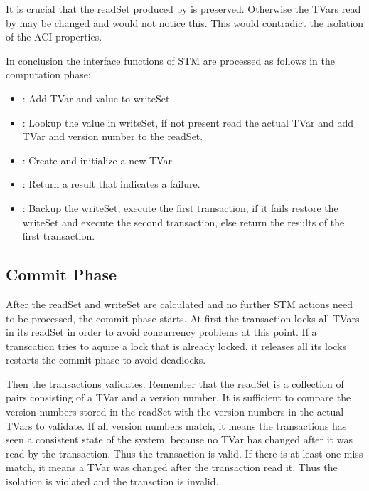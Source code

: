It is crucial that the readSet produced by  is preserved. Otherwise the TVars read by  may be changed and 
 would not notice this. This would contradict the isolation of the ACI properties. 

In conclusion the interface functions of STM are processed as follows in the computation phase:
\begin{itemize}
 \item {}: Add TVar and value to writeSet
 \item {}: Lookup the value in writeSet, if not present read the actual TVar and add TVar and version number to the readSet.
 \item {}: Create and initialize a new TVar. 
 \item {}: Return a result that indicates a failure.
 \item {}: Backup the writeSet, execute the first transaction, if it fails restore the writeSet and execute the second transaction, else return the results of the first transaction.
\end{itemize}

\subsection{Commit Phase}
After the readSet and writeSet are calculated and no further STM actions need to be processed, the commit phase starts.
At first the transaction locks all TVars in its readSet in order to avoid concurrency problems at this point.
If a transcation tries to aquire a lock that is already locked, it releases all its locks restarts the commit phase to
avoid deadlocks.

Then the transactions validates.%
Remember that the readSet is a collection of pairs consisting of a TVar and a version number.
It is sufficient to compare the version numbers stored in the readSet with the version numbers in the actual TVars to validate. 
If all version numbers match, it means the transactions has seen a consistent state
of the system, because no TVar has changed after it was read by the transaction. Thus the transaction is valid.
If there is at least one miss match, it means a TVar was changed after the transaction read it. Thus the isolation
is violated and the transction is invalid.

